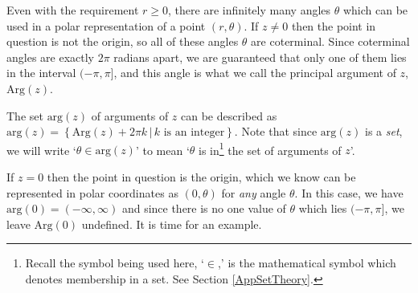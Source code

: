 \documentclass{ximera}
\begin{document}
\smallskip

Even with the requirement $r \geq 0$,  there are infinitely many angles $\theta$ which can be used in a polar representation of a point $(r,\theta)$. If $z \neq 0$ then the point in question is not the origin, so all of these angles $\theta$ are coterminal.  Since coterminal angles are exactly $2\pi$ radians apart, we are guaranteed that only one of them lies in the interval $(-\pi, \pi]$, and this angle is what we call the principal argument of $z$, $\text{Arg}(z)$.

\smallskip

The set $\text{arg}(z)$ of  arguments of $z$ can be described as $\text{arg}(z) = \left\{ \text{Arg}(z) + 2\pi k \, | \, \text{$k$ is an integer} \right\}$.  Note that since $\text{arg}(z)$ is a \textit{set}, we will write `$\theta \in \text{arg}(z)$' to mean `$\theta$ is in\footnote{Recall the symbol being used here, `$\in$,' is the mathematical symbol which denotes membership in a set.  See Section \ref{AppSetTheory}.}  the set of arguments of $z$'.   

\smallskip

If $z=0$ then the point in question is the origin, which we know can be represented in polar coordinates as $(0,\theta)$ for \textit{any} angle $\theta$. In this case, we have $\text{arg}(0) = (-\infty, \infty)$ and since there is no one value of $\theta$ which lies $(-\pi, \pi]$, we leave $\text{Arg}(0)$ undefined. It is time for an example.
\end{document}
